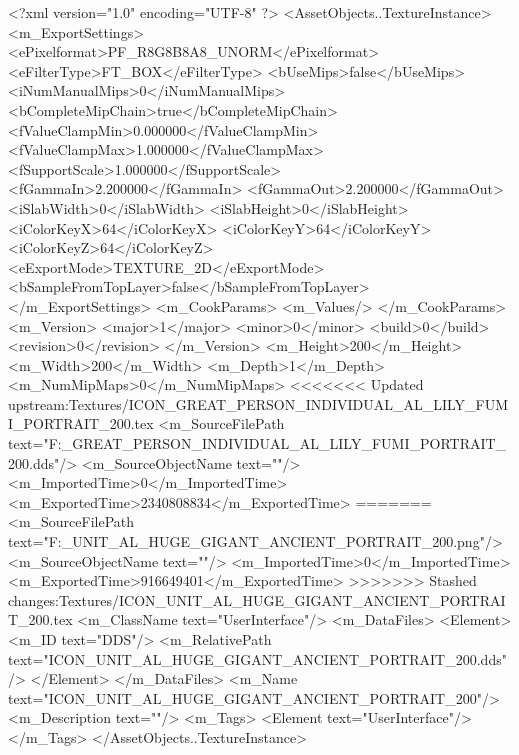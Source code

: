<?xml version="1.0" encoding="UTF-8" ?>
<AssetObjects..TextureInstance>
	<m_ExportSettings>
		<ePixelformat>PF_R8G8B8A8_UNORM</ePixelformat>
		<eFilterType>FT_BOX</eFilterType>
		<bUseMips>false</bUseMips>
		<iNumManualMips>0</iNumManualMips>
		<bCompleteMipChain>true</bCompleteMipChain>
		<fValueClampMin>0.000000</fValueClampMin>
		<fValueClampMax>1.000000</fValueClampMax>
		<fSupportScale>1.000000</fSupportScale>
		<fGammaIn>2.200000</fGammaIn>
		<fGammaOut>2.200000</fGammaOut>
		<iSlabWidth>0</iSlabWidth>
		<iSlabHeight>0</iSlabHeight>
		<iColorKeyX>64</iColorKeyX>
		<iColorKeyY>64</iColorKeyY>
		<iColorKeyZ>64</iColorKeyZ>
		<eExportMode>TEXTURE_2D</eExportMode>
		<bSampleFromTopLayer>false</bSampleFromTopLayer>
	</m_ExportSettings>
	<m_CookParams>
		<m_Values/>
	</m_CookParams>
	<m_Version>
		<major>1</major>
		<minor>0</minor>
		<build>0</build>
		<revision>0</revision>
	</m_Version>
	<m_Height>200</m_Height>
	<m_Width>200</m_Width>
	<m_Depth>1</m_Depth>
	<m_NumMipMaps>0</m_NumMipMaps>
<<<<<<< Updated upstream:Textures/ICON_GREAT_PERSON_INDIVIDUAL_AL_LILY_FUMI_PORTRAIT_200.tex
	<m_SourceFilePath text="F:\DT\lilyimages\gpportrait\ICON_GREAT_PERSON_INDIVIDUAL_AL_LILY_FUMI_PORTRAIT_200.dds"/>
	<m_SourceObjectName text=""/>
	<m_ImportedTime>0</m_ImportedTime>
	<m_ExportedTime>2340808834</m_ExportedTime>
=======
	<m_SourceFilePath text="F:\DT\lilyimages\all\ICON_UNIT_AL_HUGE_GIGANT_ANCIENT_PORTRAIT_200.png"/>
	<m_SourceObjectName text=""/>
	<m_ImportedTime>0</m_ImportedTime>
	<m_ExportedTime>916649401</m_ExportedTime>
>>>>>>> Stashed changes:Textures/ICON_UNIT_AL_HUGE_GIGANT_ANCIENT_PORTRAIT_200.tex
	<m_ClassName text="UserInterface"/>
	<m_DataFiles>
		<Element>
			<m_ID text="DDS"/>
			<m_RelativePath text="ICON_UNIT_AL_HUGE_GIGANT_ANCIENT_PORTRAIT_200.dds"/>
		</Element>
	</m_DataFiles>
	<m_Name text="ICON_UNIT_AL_HUGE_GIGANT_ANCIENT_PORTRAIT_200"/>
	<m_Description text=""/>
	<m_Tags>
		<Element text="UserInterface"/>
	</m_Tags>
</AssetObjects..TextureInstance>

